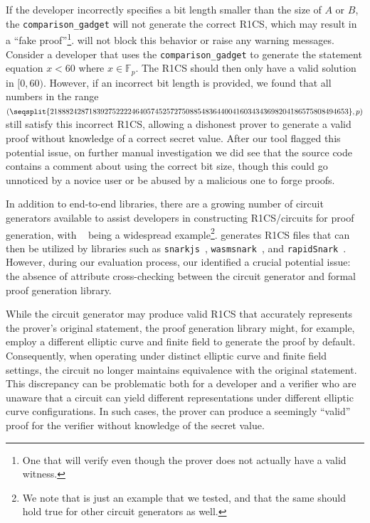 If the developer incorrectly specifies a bit length smaller than the size of $A$ or $B$, the \texttt{comparison\_gadget} will not generate the correct R1CS, which may result in a ``fake proof''\footnote{One that will verify even though the prover does not actually have a valid witness.}.  \libsnark will not block this behavior or raise any warning messages. Consider a developer that uses the \texttt{comparison\_gadget} to generate the statement equation $x < 60$ where $x \in \mathbb F_{p}$.  The R1CS should then only have a valid solution in $[0, 60)$. However, if an incorrect bit length is provided, we found that all numbers in the range $(\seqsplit{21888242871839275222246405745257275088548364400416034343698204186575808494653}, p)$ still satisfy this incorrect R1CS, allowing a dishonest prover to generate a valid proof without knowledge of a correct secret value.
After our tool flagged this potential issue, on further manual investigation we did see that the \libsnark source code contains a comment about using the correct bit size, though this could go unnoticed by a novice user or be abused by a malicious one to forge proofs.


In addition to end-to-end libraries, there are a growing number of circuit generators available to assist developers in constructing R1CS/circuits for proof generation, with \circom~\cite{circom} being a widespread example\footnote{We note that \circom is just an example that we tested, and that the same should hold true for other circuit generators as well.}.
\circom generates R1CS files that can then be utilized by libraries such as \texttt{snarkjs}~\cite{snarkjs}, \texttt{wasmsnark}~\cite{wasmsnark}, and \texttt{rapidSnark}~\cite{rapidsnark}. However, during our evaluation process, our \ConstraintChecker identified a crucial potential issue: the absence of attribute cross-checking between the circuit generator and formal proof generation library.

While the circuit generator may produce valid R1CS that accurately represents the prover's original statement, the proof generation library might, for example, employ a different elliptic curve and finite field to generate the proof by default. Consequently, when operating under distinct elliptic curve and finite field settings, the circuit no longer maintains equivalence with the original statement. This discrepancy can be problematic both for a developer and a verifier who are unaware that a circuit can yield different representations under different elliptic curve configurations.  In such cases, the prover can produce a seemingly ``valid'' proof for the verifier without knowledge of the secret value.


